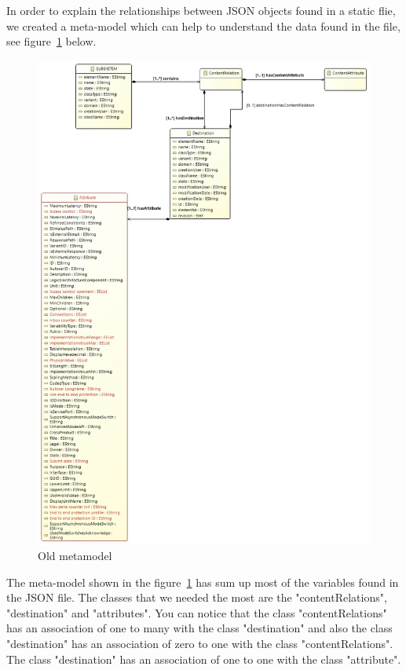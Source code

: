 In order to explain the relationships between JSON objects found in a static flie, we created a meta-model which can help to understand the data found in the file, see figure~\ref{fig:old_metamodel} below.

\begin{figure}[H]
\centering
\captionsetup{justification=centering}
\vspace{0cm}%
\includegraphics[width=0.85\linewidth]{figure/new_model/Old_Metamodel.jpg}
\caption{Old metamodel}
\label{fig:old_metamodel}
\end{figure}

The meta-model shown in the figure~\ref{fig:old_metamodel} has sum up most of the variables found in the JSON file. The classes that we needed the most are the "contentRelations", "destination" and "attributes". You can notice that the class "contentRelations" has an association of one to many with the class "destination" and also the class "destination" has an association of zero to one with the class "contentRelations". The class "destination" has an association of one to one with the class "attribute". \\

